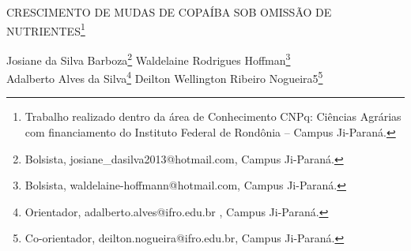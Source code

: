 \documentclass[article,12pt,onesidea,4paper,english,brazil]{abntex2}
\begin{document}
	
	
	\frenchspacing 
	
	\begin{center}
		\LARGE CRESCIMENTO DE MUDAS DE COPAÍBA SOB OMISSÃO DE NUTRIENTES\footnote{Trabalho realizado dentro da área de Conhecimento CNPq: Ciências Agrárias com financiamento do
			Instituto Federal de Rondônia – Campus Ji-Paraná.}
		
		\normalsize
	Josiane da Silva Barboza\footnote{Bolsista, josiane\_dasilva2013@hotmail.com, Campus Ji-Paraná.} 
		Waldelaine Rodrigues Hoffman\footnote{Bolsista, waldelaine-hoffmann@hotmail.com, Campus Ji-Paraná.} \\
		Adalberto Alves da Silva\footnote{Orientador, adalberto.alves@ifro.edu.br , Campus Ji-Paraná.} 
		Deilton
		Wellington Ribeiro Nogueira5\footnote{Co-orientador, deilton.nogueira@ifro.edu.br, Campus Ji-Paraná.} 
	\end{center}
	
\end{document}
